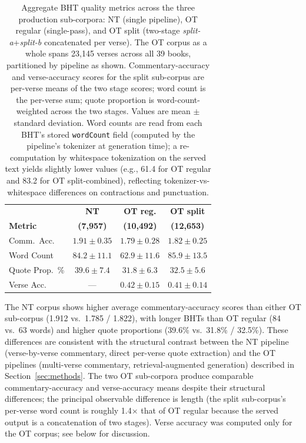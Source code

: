 \begin{table}[htbp]
\centering
\footnotesize
\setlength{\tabcolsep}{3pt}
\caption{Aggregate BHT quality metrics across the three production sub-corpora: NT (single pipeline), OT regular (single-pass), and OT split (two-stage \emph{split-a}+\emph{split-b} concatenated per verse). The OT corpus as a whole spans 23{,}145 verses across all 39 books, partitioned by pipeline as shown. Commentary-accuracy and verse-accuracy scores for the split sub-corpus are per-verse means of the two stage scores; word count is the per-verse sum; quote proportion is word-count-weighted across the two stages. Values are mean $\pm$ standard deviation. Word counts are read from each BHT's stored \texttt{wordCount} field (computed by the pipeline's tokenizer at generation time); a re-computation by whitespace tokenization on the served text yields slightly lower values (e.g., 61.4 for OT regular and 83.2 for OT split-combined), reflecting tokenizer-vs-whitespace differences on contractions and punctuation.}
\label{tab:aggregate}
\begin{tabular}{@{}lccc@{}}
\toprule
 & \textbf{NT} & \textbf{OT reg.} & \textbf{OT split} \\
\textbf{Metric} & \textbf{(7{,}957)} & \textbf{(10{,}492)} & \textbf{(12{,}653)} \\
\midrule
Comm.\ Acc. & $1.91 \pm 0.35$ & $1.79 \pm 0.28$ & $1.82 \pm 0.25$ \\
Word Count & $84.2 \pm 11.1$ & $62.9 \pm 11.6$ & $85.9 \pm 13.5$ \\
Quote Prop.\ \% & $39.6 \pm 7.4$ & $31.8 \pm 6.3$ & $32.5 \pm 5.6$ \\
Verse Acc. & --- & $0.42 \pm 0.15$ & $0.41 \pm 0.14$ \\
\bottomrule
\end{tabular}
\end{table}

\noindent The NT corpus shows higher average commentary-accuracy scores than either OT sub-corpus (1.912 vs.\ 1.785 / 1.822), with longer BHTs than OT regular (84 vs.\ 63 words) and higher quote proportions (39.6\% vs.\ 31.8\% / 32.5\%). These differences are consistent with the structural contrast between the NT pipeline (verse-by-verse commentary, direct per-verse quote extraction) and the OT pipelines (multi-verse commentary, retrieval-augmented generation) described in Section~\ref{sec:methods}. The two OT sub-corpora produce comparable commentary-accuracy and verse-accuracy means despite their structural differences; the principal observable difference is length (the split sub-corpus's per-verse word count is roughly 1.4$\times$ that of OT regular because the served output is a concatenation of two stages). Verse accuracy was computed only for the OT corpus; see below for discussion.

